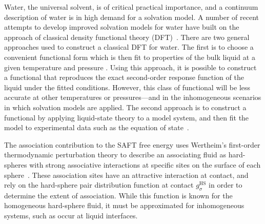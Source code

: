 Water, the universal solvent, is of critical practical importance, and
a continuum description of water is in high demand for a solvation
model.  A number of recent attempts to develop improved solvation
models for water have built on the approach of classical
density functional theory (DFT)~\cite{jeanmairet2013molecular,
  zhao2011molecular, zhao2011new, ramirez2005direct,
  ramirez2005density, levesque2012solvation, levesque2012scalar}.
There are two general
approaches used to construct a classical DFT for water.  The first is
to choose a convenient functional form which is then fit to properties
of the bulk liquid at a given temperature and pressure
\cite{jeanmairet2013molecular, zhao2011molecular, zhao2011new,
  ramirez2005direct, ramirez2005density, levesque2012solvation,
  levesque2012scalar, lischner2010classical}.  Using this approach, it
is possible to construct a functional that reproduces the exact
second-order response function of the liquid under the fitted
conditions.  However, this class of functional will be less accurate
at other temperatures or pressures---and in the inhomogeneous
scenarios in which solvation models are applied.  The second approach
is to construct a functional by applying liquid-state theory to a
model system, and then fit the model to experimental data such as the
equation of state~\cite{hughes2013classical, clark2006developing,
  gloor2002saft, gloor2004accurate, gloor2007prediction, Jaqaman2004,
  chuev2006, fu2005vapor-liquid-dft,kiselev2006new,
  blas2001examination, sundararaman2012computationally}.

The association contribution to the SAFT free energy uses
Wertheim's first-order thermodynamic perturbation theory to describe
an associating fluid as hard-spheres with strong associative
interactions at specific sites on the surface of each
sphere~\cite{wertheim1984fluidsI, wertheim1984fluidsII,
  wertheim1986fluidsIII, wertheim1986fluidsIV}.  These association
sites have an attractive interaction at contact, and rely on the
hard-sphere pair distribution function at contact $g_\sigma^\text{HS}$
in order to determine the extent of association.  While this function
is known for the homogeneous hard-sphere fluid, it must be
approximated for inhomogeneous systems, such as occur at liquid
interfaces.

